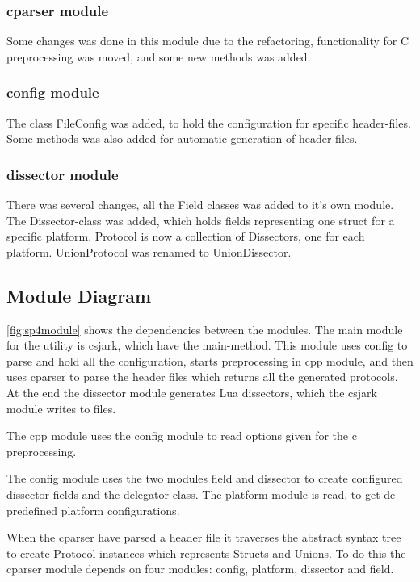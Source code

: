 \subsubsection{cparser module}
Some changes was done in this module due to the refactoring, functionality for C preprocessing was moved, and some new methods was added. 

\subsubsection{config module}
The class FileConfig was added, to hold the configuration for specific header-files. Some methods was also added for automatic generation of header-files.

\subsubsection{dissector module}
There was several changes, all the Field classes was added to it's own module.
The Dissector-class was added, which holds fields representing one struct for
a specific platform. Protocol is now a collection of Dissectors, one for each
platform. UnionProtocol was renamed to UnionDissector.

\subsection{Module Diagram}
\label{sec:sp4:design:md}
\autoref{fig:sp4module} shows the dependencies between the modules. The main 
module for the utility is csjark, which have the main-method. This module 
uses config to parse and hold all the configuration, starts preprocessing in 
cpp module, and then uses cparser to parse the header files which returns
all the generated protocols. At the end the dissector module generates
Lua dissectors, which the csjark module writes to files.

The cpp module uses the config module to read options given for the c 
preprocessing.

The config module uses the two modules field and dissector to create 
configured dissector fields and the delegator class.
The platform module is read, to get de predefined platform configurations.

When the cparser have parsed a header file it traverses the abstract syntax
tree to create Protocol instances which represents Structs and Unions. To do
this the cparser module depends on four modules: config, platform, dissector
and field.

